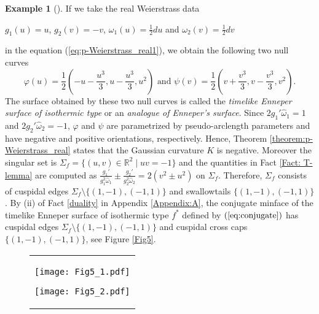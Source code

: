 \documentclass[11pt,reqno]{amsart}
\theoremstyle{plain} %
\theoremstyle{definition}
\newtheorem{example}[theorem]{Example}
\begin{document}
\begin{example}[\cite{IT, Konderak,T}]\label{Lorentzian Enneper}
If we take the real Weierstrass data
\begin{center}
$g_1(u)=u$, $g_2(v)=-v$, $\omega_1(u)=\frac{1}{2}du$ and $\omega_2(v)=\frac{1}{2}dv$
\end{center}
in the equation (\ref{eq:p-Weierstrass_real1}), we obtain the following two null curves
\begin{equation*}
\varphi(u)=\frac{1}{2}(-u-\frac{u^3}{3},u-\frac{u^3}{3},u^2) \text{ and } \psi(v)=\frac{1}{2}(v+\frac{v^3}{3},v-\frac{v^3}{3},v^2).
\end{equation*}
The surface obtained by these two null curves is called the {\it timelike Enneper surface of isothermic type} or an {\it analogue of Enneper's surface}. Since $2g_1'\hat{\omega}_1=1$ and $2g_2'\hat{\omega}_2=-1$, $\varphi$ and $\psi$ are parametrized by pseudo-arclength parameters and have negative and positive orientations, respectively. Hence, Theorem \ref{theorem:p-Weierstrass_real} states that the Gaussian curvature $K$ is negative. Moreover the singular set is $\Sigma_f=\{(u,v)\in \mathbb{R}^2\mid uv=-1\}$ and the quantities in Fact \ref{Fact: T-lemma} are computed as $\frac{g_1'}{g_1^2\hat{\omega}_1}\pm \frac{g_2'}{g_2^2\hat{\omega}_2}=2(v^2\pm u^2)$ on $\Sigma_f$. Therefore, $\Sigma_f$ consists of cuspidal edges $\Sigma_f \setminus \{(1,-1), (-1,1)\}$ and swallowtails $\{(1,-1), (-1,1)\}$. By (ii) of Fact \ref{duality} in Appendix \ref{Appendix:A}, the conjugate minface of the timelike Enneper surface of isothermic type $f^*$ defined by $(\ref{eq:conjugate})$ has cuspidal edges $\Sigma_f \setminus \{(1,-1), (-1,1)\}$ and cuspidal cross caps $\{(1,-1), (-1,1)\}$, see Figure \ref{Fig5}.
\vspace{+0.1cm}
\begin{figure}[!h]
\begin{center}
\begin{tabular}{c}
\hspace{+2.2cm}
\begin{minipage}{0.4\hsize}
\begin{center}
\vspace{-1.6cm}
\texttt{[image: Fig5\_1.pdf]}
\vspace{0.5cm}
\end{center}
\end{minipage}
\begin{minipage}{0.4\hsize}
\begin{center}
\vspace{-1.1cm}
\texttt{[image: Fig5\_2.pdf]}
\vspace{0.1cm}
\end{center}
\end{minipage}


\end{tabular}
\end{center}
\end{figure}
\end{example}
\end{document}
